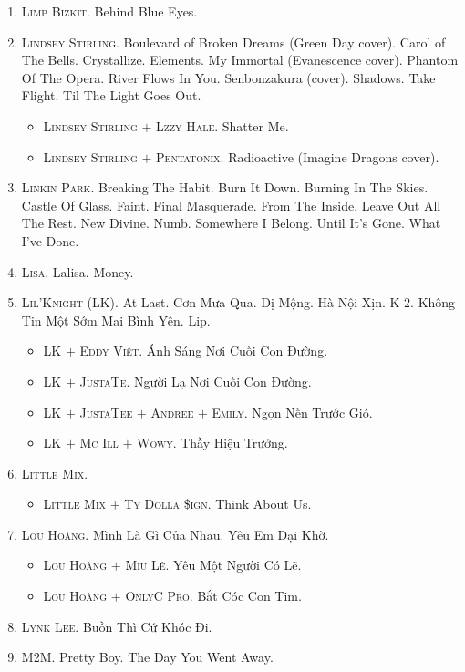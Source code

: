 \documentclass{article}
\numberwithin{equation}{section}
\begin{document}
\begin{enumerate}
	\item \textsc{Limp Bizkit.} Behind Blue Eyes.
	\item \textsc{Lindsey Stirling.} Boulevard of Broken Dreams (Green Day cover). Carol of The Bells. Crystallize. Elements. My Immortal (Evanescence cover). Phantom Of The Opera. River Flows In You. Senbonzakura (cover). Shadows. Take Flight. Til The Light Goes Out.
	\begin{itemize}
		\item \textsc{Lindsey Stirling $+$ Lzzy Hale.} Shatter Me.
		\item \textsc{Lindsey Stirling $+$ Pentatonix.} Radioactive (Imagine Dragons cover).
	\end{itemize}
	\item \textsc{Linkin Park.} Breaking The Habit. Burn It Down. Burning In The Skies. Castle Of Glass. Faint. Final Masquerade. From The Inside. Leave Out All The Rest. New Divine. Numb. Somewhere I Belong. Until It's Gone. What I've Done.
	\item \textsc{Lisa.} Lalisa. Money.
	\item \textsc{Lil'Knight (LK).} At Last. Cơn Mưa Qua. Dị Mộng. Hà Nội Xịn. K 2. Không Tin Một Sớm Mai Bình Yên. Lip.
	\begin{itemize}
		\item \textsc{LK $+$ Eddy Việt.} Ánh Sáng Nơi Cuối Con Đường.
		\item \textsc{LK $+$ JustaTe.} Người Lạ Nơi Cuối Con Đường.
		\item \textsc{LK $+$ JustaTee $+$ Andree $+$ Emily.} Ngọn Nến Trước Gió.
		\item \textsc{LK $+$ Mc Ill $+$ Wowy.} Thầy Hiệu Trưởng.
	\end{itemize}
	\item \textsc{Little Mix.}
	\begin{itemize}
		\item \textsc{Little Mix $+$ Ty Dolla \$ign.} Think About Us.
	\end{itemize}
	\item \textsc{Lou Hoàng.} Mình Là Gì Của Nhau. Yêu Em Dại Khờ.
	\begin{itemize}
		\item \textsc{Lou Hoàng $+$ Miu Lê.} Yêu Một Người Có Lẽ.
		\item \textsc{Lou Hoàng $+$ OnlyC Pro.} Bắt Cóc Con Tim.
	\end{itemize}
	\item \textsc{Lynk Lee.} Buồn Thì Cứ Khóc Đi.
	\item \textsc{M2M.} Pretty Boy. The Day You Went Away.

\end{enumerate}
\end{document}
